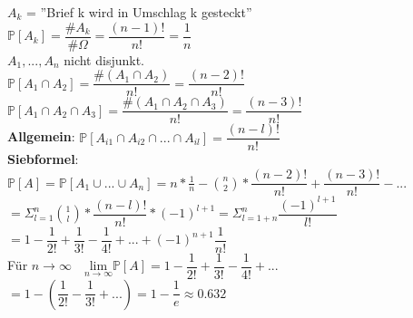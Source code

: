 $A_k$ = ''Brief k wird in Umschlag k gesteckt''\medskip\\
$\mathds{P}[A_k] = \dfrac{\#A_k}{\#\Omega}=\dfrac{(n-1)!}{n!} = \dfrac{1}{n}$\smallskip\\
$A_1,...,A_n $ nicht disjunkt.\\
$\mathds{P}[A_1\cap A_2] = \dfrac{\#(A_1 \cap A_2)}{n!} = \dfrac{(n-2)!}{n!}$\medskip\\
$\mathds{P}[A_1\cap A_2\cap A_3]=\dfrac{\#(A_1 \cap A_2 \cap A_3)}{n!} = \dfrac{(n-3)!}{n!}$\medskip\\
\textbf{Allgemein}: $ \mathds{P}[A_{i1}\cap A_{i2}\cap...\cap A_{il}]=\dfrac{(n-l)!}{n!}$\smallskip\\
\textbf{Siebformel}: $\mathds{P}[A] = \mathds{P}[A_1\cup ... \cup A_n]= n * \frac{1}{n}- \binom{n}{2}*\dfrac{(n-2)!}{n!}+\dfrac{(n-3)!}{n!}-...$\medskip\\
$= \Sigma_{l=1}^n \binom{1}{l}*\dfrac{(n-l)!}{n!}*(-1)^{l+1}= \Sigma_{l=1+n}^n\dfrac{(-1)^{l+1}}{l!}$ \medskip\\
$=1-\dfrac{1}{2!}+\dfrac{1}{3!}-\dfrac{1}{4!}+...+(-1)^{n+1}\dfrac{1}{n!}$\medskip\\
Für $n\rightarrow\infty  \quad \underset{n\rightarrow\infty}{\text{lim}}\mathds{P}[A]= 1-\dfrac{1}{2!}+\dfrac{1}{3!}-\dfrac{1}{4!}+... $\smallskip\\
$= 1- (\dfrac{1}{2!}-\dfrac{1}{3!}+...)= 1 - \dfrac{1}{e} \approx 0.632$
